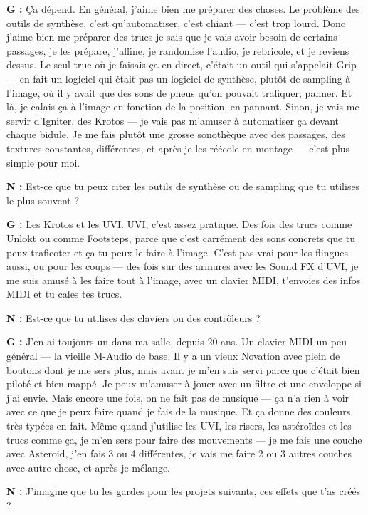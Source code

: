 ﻿\documentclass[12pt]{article}
\begin{document}
\textbf{G :} Ça dépend. En général, j'aime bien me préparer des choses. Le problème des outils de synthèse, c'est qu'automatiser, c'est chiant — c'est trop lourd. Donc j'aime bien me préparer des trucs je sais que je vais avoir besoin de certains passages, je les prépare, j'affine, je randomise l'audio, je rebricole, et je reviens dessus. Le seul truc où je faisais ça en direct, c'était un outil qui s'appelait Grip — en fait un logiciel qui était pas un logiciel de synthèse, plutôt de sampling à l'image, où il y avait que des sons de pneus qu'on pouvait trafiquer, panner. Et là, je calais ça à l'image en fonction de la position, en pannant. Sinon, je vais me servir d'Igniter, des Krotos — je vais pas m'amuser à automatiser ça devant chaque bidule. Je me fais plutôt une grosse sonothèque avec des passages, des textures constantes, différentes, et après je les réécole en montage — c'est plus simple pour moi.

\textbf{N :} Est-ce que tu peux citer les outils de synthèse ou de sampling que tu utilises le plus souvent ?

\textbf{G :} Les Krotos et les UVI. UVI, c'est assez pratique. Des fois des trucs comme Unlokt ou comme Footsteps, parce que c'est carrément des sons concrets que tu peux traficoter et ça tu peux le faire à l'image. C'est pas vrai pour les flingues aussi, ou pour les coups — des fois sur des armures avec les Sound FX d'UVI, je me suis amusé à les faire tout à l'image, avec un clavier MIDI, t'envoies des infos MIDI et tu cales tes trucs.

\textbf{N :} Est-ce que tu utilises des claviers ou des contrôleurs ?

\textbf{G :} J'en ai toujours un dans ma salle, depuis 20 ans. Un clavier MIDI un peu général — la vieille M-Audio de base. Il y a un vieux Novation avec plein de boutons dont je me sers plus, mais avant je m'en suis servi parce que c'était bien piloté et bien mappé. Je peux m'amuser à jouer avec un filtre et une enveloppe si j'ai envie. Mais encore une fois, on ne fait pas de musique — ça n'a rien à voir avec ce que je peux faire quand je fais de la musique. Et ça donne des couleurs très typées en fait. Même quand j'utilise les UVI, les risers, les astéroïdes et les trucs comme ça, je m'en sers pour faire des mouvements — je me fais une couche avec Asteroid, j'en fais 3 ou 4 différentes, je vais me faire 2 ou 3 autres couches avec autre chose, et après je mélange.

\textbf{N :} J'imagine que tu les gardes pour les projets suivants, ces effets que t'as créés ?
\end{document}
